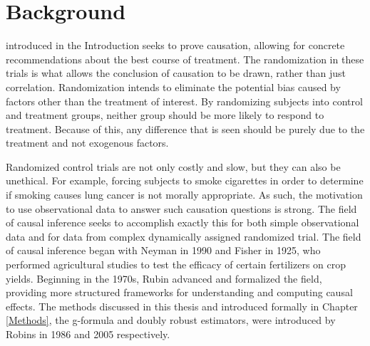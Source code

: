
\chapter{Background}

 introduced in the Introduction seeks to prove causation, allowing for concrete recommendations about the best course of treatment.  The randomization in these trials is what allows the conclusion of causation to be drawn, rather than just correlation.  Randomization intends to eliminate the potential bias caused by factors other than the treatment of interest.  By randomizing subjects into control and treatment groups, neither group should be more likely to respond to treatment.  Because of this, any difference that is seen should be purely due to the treatment and not exogenous factors.  

Randomized control trials are not only costly and slow, but they can also be unethical.  For example, forcing subjects to smoke cigarettes in order to determine if smoking causes lung cancer is not morally appropriate.  As such, the motivation to use observational data to answer such causation questions is strong.  The field of causal inference seeks to accomplish exactly this for both simple observational data and for data from complex dynamically assigned randomized trial.  The field of causal inference began with Neyman in 1990 and Fisher in 1925, who performed agricultural studies to test the efficacy of certain fertilizers on crop yields.\cite{edwards2005ra, fisher1935design, splawa1990application}  Beginning in the 1970s, Rubin advanced and formalized the field, providing more structured frameworks for understanding and computing causal effects.\cite{rosenbaum1984reducing, rubin1974estimating, rubin1978bayesian, rubin1984william} The methods discussed in this thesis and introduced formally in Chapter \ref{Methods}, the g-formula and doubly robust estimators, were introduced by Robins in 1986 and 2005 respectively.\cite{bang2005doubly, robins1986new}

